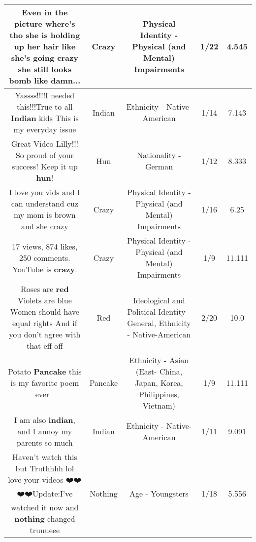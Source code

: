 \documentclass[11pt]{article}
\newlength\mylength
\begin{document}
\begin{center}
\begin{longtable}{|C{.65\mylength}|C{.30\mylength}|C{.12\mylength}|C{.12\mylength}|C{.12\mylength}|}
  \small Even in the picture where's tho she is holding up her hair like she's going \textbf{crazy} she still looks bomb like damn...\normalsize   & Crazy & Physical Identity - Physical (and Mental) Impairments & 1/22 & 4.545 \\  \hline
  \small Yassss!!!!I needed this!!!True to all \textbf{Indian} kids This is my everyday issue\normalsize   & Indian & Ethnicity - Native-American & 1/14 & 7.143 \\  \hline
  \small Great Video Lilly!!! So proud of your success! Keep it up \textbf{hun}!\normalsize   & Hun & Nationality - German & 1/12 & 8.333 \\  \hline
  \small I love you vids and I can understand cuz my mom is brown and she crazy\normalsize   & Crazy & Physical Identity - Physical (and Mental) Impairments & 1/16 & 6.25 \\  \hline
  \small 17 views, 874 likes, 250 comments. YouTube is \textbf{crazy}.\normalsize   & Crazy & Physical Identity - Physical (and Mental) Impairments & 1/9 & 11.111 \\  \hline
  \small Roses are \textbf{r\textbf{ed}} Violets are blue Women should have equal rights And if you don't agree with that eff off\normalsize   & Red &  Ideological and Political Identity - General, Ethnicity - Native-American & 2/20 & 10.0 \\  \hline
  \small Potato \textbf{Pancake} this is my favorite poem ever 👏\normalsize   & Pancake & Ethnicity - Asian (East- China, Japan, Korea, Philippines, Vietnam) & 1/9 & 11.111 \\  \hline
  \small I am also \textbf{indian}, and I annoy my parents so much\normalsize   & Indian & Ethnicity - Native-American & 1/11 & 9.091 \\  \hline
  \small Haven't watch this but Truthhhh lol love your videos ❤️❤️❤️❤️Update:I've watched it now and \textbf{nothing} changed truuueee\normalsize   & Nothing & Age - Youngsters & 1/18 & 5.556 \\  \hline

\end{longtable}
\end{center}
\end{document}
